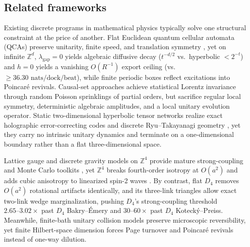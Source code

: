 \subsection{Related frameworks}

Existing discrete programs in mathematical physics typically solve one structural constraint at the price of another.
Flat Euclidean quantum cellular automata (QCAs) preserve unitarity, finite speed, and translation symmetry
\cite{schumacher2004, arrighi2019, farrelly2020}, yet on infinite $\mathbb{Z}^d$, $\lambda_{\mathrm{gap}} = 0$ yields
algebraic diffusive decay ($t^{-d/2}$ vs.\ hyperbolic $< 2^{-t}$) and $h = 0$ yields a vanishing $O(R^{-1})$ export
ceiling (vs.\ $\ge 36.30\text{ nats/dock/beat}$), while finite periodic boxes reflect excitations into Poincar\'e revivals.
Causal-set approaches achieve statistical Lorentz invariance through random Poisson sprinklings of partial
orders, but sacrifice regular local symmetry, deterministic algebraic amplitudes, and a local unitary evolution
operator. Static two-dimensional hyperbolic tensor networks \cite{pastawski2015happy} realize exact holographic
error-correcting codes and discrete Ryu--Takayanagi geometry \cite{ryu2006rt}, yet they carry no intrinsic unitary
dynamics and terminate on a one-dimensional boundary rather than a flat three-dimensional space.

Lattice gauge and discrete gravity models on $\mathbb{Z}^4$ provide mature strong-coupling and Monte Carlo toolkits
\cite{wilson1974, osterwalder1978, kotecky1986}, yet $\mathbb{Z}^4$ breaks fourth-order isotropy at $O(a^2)$ and adds
cubic anisotropy to linearized spin-2 waves \cite{celmaster1982}. By contrast, flat $D_4$ removes $O(a^2)$ rotational
artifacts identically, and its three-link triangles allow exact two-link wedge marginalization, pushing $D_4$'s
strong-coupling threshold $2.65\text{--}3.02\times$ past $D_4$ Bakry--\'Emery and $30\text{--}60\times$ past $D_4$
Koteck\'y--Preiss. Meanwhile, finite-bath unitary collision models preserve microscopic reversibility, yet finite
Hilbert-space dimension forces Page turnover and Poincar\'e revivals \cite{page1993} instead of one-way dilution.

